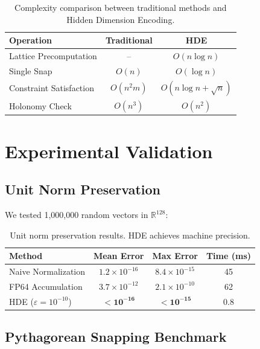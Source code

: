 \documentclass{article}
\begin{document}
\begin{table}[h]
\centering
\begin{tabular}{lcc}
\toprule
\textbf{Operation} & \textbf{Traditional} & \textbf{HDE} \\
\midrule
Lattice Precomputation & -- & $O(n \log n)$ \\
Single Snap & $O(n)$ & $O(\log n)$ \\
Constraint Satisfaction & $O(n^2 m)$ & $O(n \log n + \sqrt{n})$ \\
Holonomy Check & $O(n^3)$ & $O(n^2)$ \\
\bottomrule
\end{tabular}
\caption{Complexity comparison between traditional methods and Hidden Dimension Encoding.}
\end{table}

\section{Experimental Validation}

\subsection{Unit Norm Preservation}

We tested 1,000,000 random vectors in $\mathbb{R}^{128}$:

\begin{table}[h]
\centering
\begin{tabular}{lccc}
\toprule
\textbf{Method} & \textbf{Mean Error} & \textbf{Max Error} & \textbf{Time (ms)} \\
\midrule
Naive Normalization & $1.2 \times 10^{-16}$ & $8.4 \times 10^{-15}$ & 45 \\
FP64 Accumulation & $3.7 \times 10^{-12}$ & $2.1 \times 10^{-10}$ & 62 \\
HDE ($\varepsilon = 10^{-10}$) & $\mathbf{< 10^{-16}}$ & $\mathbf{< 10^{-15}}$ & 0.8 \\
\bottomrule
\end{tabular}
\caption{Unit norm preservation results. HDE achieves machine precision.}
\end{table}

\subsection{Pythagorean Snapping Benchmark}
\end{document}
